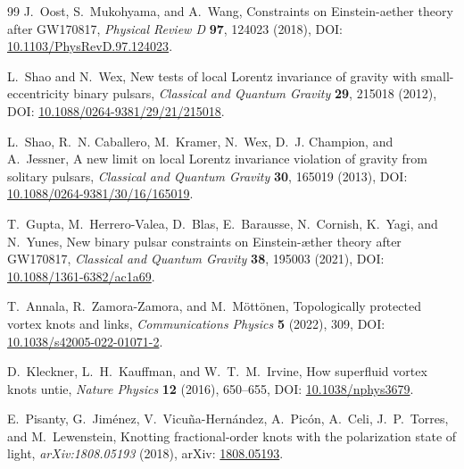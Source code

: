 \documentclass[11pt]{article}
\theoremstyle{definition}
\theoremstyle{plain}
\theoremstyle{remark}
\begin{document}
\begin{thebibliography}{99}
            J.~Oost, S.~Mukohyama, and A.~Wang,
            \newblock Constraints on Einstein-aether theory after GW170817,
            \newblock \emph{Physical Review D} \textbf{97}, 124023 (2018),
            \newblock DOI: \href{https://doi.org/10.1103/PhysRevD.97.124023}{10.1103/PhysRevD.97.124023}.

            L.~Shao and N.~Wex,
            \newblock New tests of local Lorentz invariance of gravity with small-eccentricity binary pulsars,
            \newblock \emph{Classical and Quantum Gravity} \textbf{29}, 215018 (2012),
            \newblock DOI: \href{https://doi.org/10.1088/0264-9381/29/21/215018}{10.1088/0264-9381/29/21/215018}.

            L.~Shao, R.~N. Caballero, M.~Kramer, N.~Wex, D.~J. Champion, and A.~Jessner,
            \newblock A new limit on local Lorentz invariance violation of gravity from solitary pulsars,
            \newblock \emph{Classical and Quantum Gravity} \textbf{30}, 165019 (2013),
            \newblock DOI: \href{https://doi.org/10.1088/0264-9381/30/16/165019}{10.1088/0264-9381/30/16/165019}.

            T.~Gupta, M.~Herrero-Valea, D.~Blas, E.~Barausse, N.~Cornish, K.~Yagi, and N.~Yunes,
            \newblock New binary pulsar constraints on Einstein-\ae ther theory after GW170817,
            \newblock \emph{Classical and Quantum Gravity} \textbf{38}, 195003 (2021),
            \newblock DOI: \href{https://doi.org/10.1088/1361-6382/ac1a69}{10.1088/1361-6382/ac1a69}.

            T.~Annala, R.~Zamora-Zamora, and M.~M{\"o}tt{\"o}nen,
            \newblock Topologically protected vortex knots and links,
            \newblock \emph{Communications Physics} \textbf{5} (2022), 309,
            \newblock DOI: \href{https://doi.org/10.1038/s42005-022-01071-2}{10.1038/s42005-022-01071-2}.

            D.~Kleckner, L.~H.~Kauffman, and W.~T.~M.~Irvine,
            \newblock How superfluid vortex knots untie,
            \newblock \emph{Nature Physics} \textbf{12} (2016), 650--655,
            \newblock DOI: \href{https://doi.org/10.1038/nphys3679}{10.1038/nphys3679}.

            E.~Pisanty, G.~Jim{\'e}nez, V.~Vicu{\~n}a-Hern{\'a}ndez, A.~Pic{\'o}n, A.~Celi, J.~P.~Torres, and M.~Lewenstein,
            \newblock Knotting fractional-order knots with the polarization state of light,
            \newblock \emph{arXiv:1808.05193} (2018),
            \newblock arXiv: \href{https://arxiv.org/abs/1808.05193}{1808.05193}.


\end{thebibliography}
\end{document}
